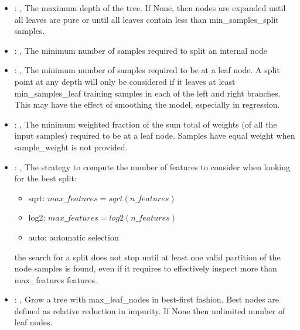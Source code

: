 \begin{itemize}
    \item {}: , 
      The maximum depth of the tree. If None, then nodes are expanded until all leaves are pure
      or until all leaves contain less than min\_samples\_split samples.

    \item {}: , 
      The minimum number of samples required to split an internal node

    \item {}: , 
      The minimum number of samples required to be at a leaf node. A split point at any
      depth will only be considered if it leaves at least min\_samples\_leaf training samples in
      each                                                  of the left and right branches. This may
      have the effect of smoothing the model, especially
      in regression.

    \item {}: , 
      The minimum weighted fraction of the sum total of weights (of all the input samples)
      required to be at a leaf node. Samples have equal weight when sample\_weight is not provided.

    \item {}: , 
      The strategy to compute the number of features to consider when looking for the best split:
      \begin{itemize}                                                     \item sqrt:
      $max\_features=sqrt(n\_features)$                                                     \item
      log2: $max\_features=log2(n\_features)$
      \item auto: automatic selection
      \end{itemize}                                                   \nb the search for a split
      does not stop until at least one valid partition of the node
      samples is found, even if it requires to effectively inspect more than max\_features features.

    \item {}: , 
      Grow a tree with max\_leaf\_nodes in best-first fashion. Best nodes are defined as relative
      reduction                                                  in impurity. If None then unlimited
      number of leaf nodes.


\end{itemize}
